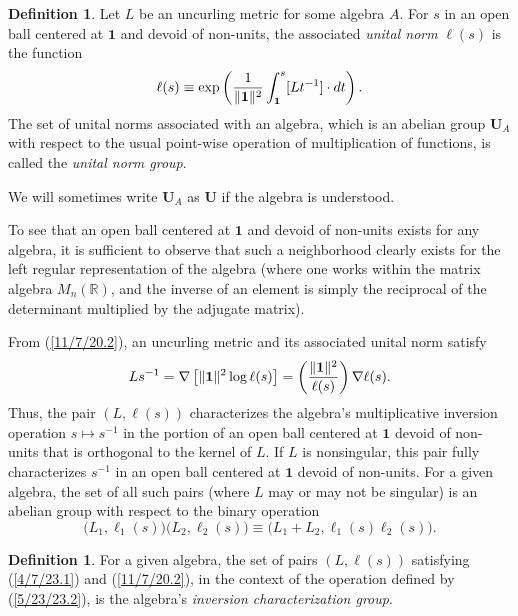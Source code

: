 \documentclass{amsart}
\numberwithin{equation}{section}
\theoremstyle{definition}
\newtheorem{definition}[theorem]{Definition}
\numberwithin{theorem}{section}
\begin{document}
  
  \begin{definition}\label{9/21/23.2} Let $L$ be an uncurling metric for some algebra $A$.  For $s$ in an open ball centered at $\mathbf{1}$ and devoid of non-units, the associated {\it unital norm} $ \ell(s)$ is the function \enlargethispage{1.5cm}
  \begin{equation}\label{11/7/20.2}   \ell(s) \equiv \exp\left({\frac{1}{\|{\bf 1}\|^2}\int_{\bf 1}^s [Lt^{-1}]\cdot dt}\right).\end{equation} 
   The set of unital norms associated with an algebra, which is an abelian group $\mathbf{U}_A$ with respect to the usual point-wise operation of multiplication of functions, is called the {\it unital norm group}. \end{definition} 
   
   We will sometimes write $\mathbf{U}_A$ as $\mathbf{U}$ if the algebra is understood.
   
To see that an open ball centered at $\mathbf{1}$ and devoid of non-units exists for any algebra, it is sufficient to observe that such a neighborhood clearly exists for the left regular representation of the algebra (where one works within the matrix algebra $ M_n(\mathbb{R})$, and the inverse of an element is simply the reciprocal of the determinant multiplied by the adjugate matrix).
  
    From (\ref{11/7/20.2}), an uncurling metric and its associated unital norm satisfy  \begin{equation}\label{11/7/20.1} Ls^{-1}  = \nabla\left[\|{\bf 1}\|^2\log  \ell(s)\right] =   \left(\frac{\|{\bf 1}\|^2}{ \ell(s)}\right)\nabla \ell(s).\end{equation} 
Thus, the pair $(L, \ell(s))$ characterizes the algebra's multiplicative inversion operation $s\mapsto s^{-1}$ in the portion of an open ball centered at $\mathbf{1}$ devoid of non-units that is orthogonal to the kernel of $L$.  If $L$ is nonsingular, this pair fully characterizes $s^{-1}$ in an open ball centered at $\mathbf{1}$ devoid of non-units.  For a given algebra, the set of all such pairs (where $L$ may or may not be singular) is an abelian group with respect to the binary operation 
\begin{equation}\label{5/23/23.2} \big(L_1, \ell_1(s)\big)\big(L_2, \ell_2(s)\big) \equiv 
\big(L_1+L_2, \ell_1(s)  \ell_2(s)\big).\end{equation} 
\begin{definition} For a given algebra, the set of pairs $(L, \ell(s))$ satisfying (\ref{4/7/23.1}) and (\ref{11/7/20.2}), in the context of the operation defined by (\ref{5/23/23.2}), is the algebra's {\it inversion characterization group}. \end{definition}
\end{document}
